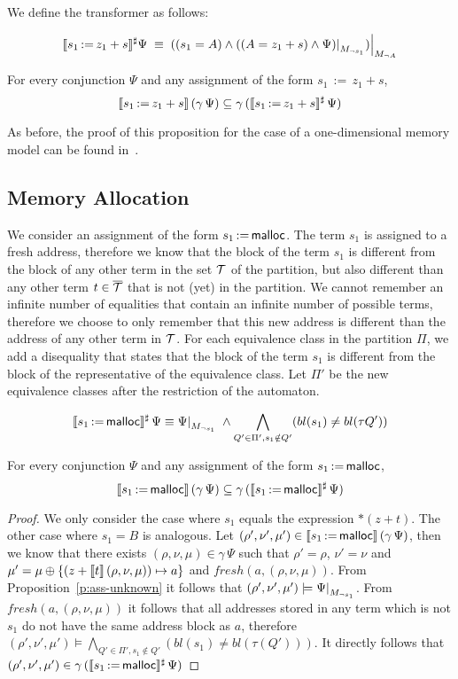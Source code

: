 We define the transformer as follows:

\[
	\sem{s_1\,{:=}\,z_1+s}^\sharp\Psi\;\equiv\;
	\restr{((s_1=A)\land\restr{((A=z_1+s)\land\Psi)}{M_{\neg s_1}})}{M_{\neg A}}
\]

\begin{proposition}\label{p:ass-definite}
	For every conjunction $\Psi$ and any assignment of the form $s_1\,{:=}\,z_1+s$,
	\[
		\llbracket s_1\,{:=}\,z_1+s\rrbracket\,(\gamma\,\Psi) \subseteq \gamma\,(\llbracket s_1\,{:=}\,z_1+s\rrbracket^\sharp\,\Psi)
	\]
\end{proposition}

As before, the proof of this proposition for the case of a one-dimensional memory model can be found in~\cite{2pointer}.

\subsection{Memory Allocation}

We consider an assignment of the form $s_1\,{:=}\,\textsf{malloc}$.
The term $s_1$ is assigned to a fresh address, therefore we know that the block of the term $s_1$ is different from the block of any other term in the set $\mathcal{T}$ of the partition, but also different than any other term $t \in {\overline{\mathcal{T}}}$ that is not (yet) in the partition.
We cannot remember an infinite number of equalities that contain an infinite number of possible terms, therefore we choose to only remember that this new address is different than the address of any other term in $\mathcal{T}$.
For each equivalence class in the partition $\Pi$, we add a disequality that states that the block of the term $s_1$ is different from the block of the representative of the equivalence class.
Let $\Pi'$ be the new equivalence classes after the restriction of the automaton.

\[
	\sem{s_1\,{:=}\,\text{\malloc}}^\sharp\,\Psi \equiv
	\restr{\Psi}{M_{\neg s_1}}\;\land
	\bigwedge_{Q'\in \Pi',s_1\notin Q'}(bl(s_1) \neq bl(\tau Q'))
\]
\begin{proposition}\label{p:ass-malloc}
	For every conjunction $\Psi$ and any assignment of the form $s_1\,{:=}\,\textsf{malloc}$,
	\[
		\llbracket s_1\,{:=}\,\textsf{malloc}\rrbracket\,(\gamma\,\Psi) \subseteq \gamma\,(\llbracket s_1\,{:=}\,\textsf{malloc}\rrbracket^\sharp\,\Psi)
	\]
\end{proposition}
\begin{proof}
	We only consider the case where $s_1$ equals the expression $*(z+t)$.
	The other case where $s_1 = B$ is analogous.
	Let $(\rho',\nu',\mu') \in \llbracket s_1\,{:=}\,\textsf{malloc}\rrbracket\,(\gamma\,\Psi)$, then we know that there exists $(\rho,\nu,\mu) \in \gamma\,\Psi$ such that $\rho'=\rho$, $\nu'=\nu$ and $\mu' =\mu\oplus\{(z+\llbracket t\rrbracket\,(\rho,\nu,\mu))\mapsto a\}$ and $fresh(a, (\rho, \nu, \mu))$.
	From Proposition~\ref{p:ass-unknown} it follows that $(\rho',\nu',\mu') \models \restr{\Psi}{M_{\neg s_1}}$.
	From $fresh(a,( \rho,\nu,\mu))$ it follows that all addresses stored in any term which is not $s_1$ do not have the same address block as $a$, therefore $(\rho',\nu',\mu') \models \bigwedge_{Q'\in \Pi', s_1\notin Q'}(bl(s_1) \neq bl(\tau(Q')))$.
	It directly follows that $(\rho',\nu',\mu') \in \gamma\,(\llbracket s_1\,{:=}\,\textsf{malloc}\rrbracket^\sharp\,\Psi)$
\end{proof}
